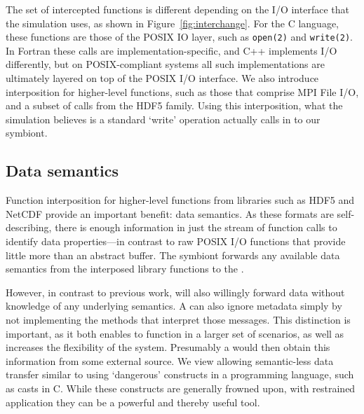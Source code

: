 The set of intercepted functions is different depending on the I/O
interface that the
simulation uses, as shown in Figure~\ref{fig:interchange}.  For the C
language, these functions are those of the POSIX
IO layer, such as \texttt{open(2)} and \texttt{write(2)}.  In Fortran
these calls are implementation-specific, and C++ implements I/O
differently, but on POSIX-compliant systems all such implementations
are ultimately layered on top of the POSIX I/O interface.  We also
introduce interposition for higher-level functions, such as those that
comprise MPI File I/O, and a subset of calls from the HDF5 family.
Using this interposition, what the simulation believes is a standard
`write' operation actually calls in to our symbiont.

\subsection{Data semantics}

Function interposition for higher-level functions from libraries such
as HDF5 and NetCDF provide an important benefit: data semantics.  As
these formats are self-describing, there is enough information in just
the stream of function calls to identify data properties---in contrast
to raw POSIX I/O functions that provide little more than an abstract
buffer.  The symbiont forwards any available data semantics from the
interposed library functions to the
\freeprocessor{}.

However, in contrast to previous work, \freeprocessing{} will also
willingly forward data without knowledge of any underlying semantics.
A \freeprocessor{} can also ignore metadata simply by not implementing
the methods that interpret those messages.  This distinction is
important, as it both enables \freeprocessing{} to function in a larger
set of scenarios, as well as increases the flexibility of the system.
Presumably a \freeprocessor{} would then obtain this information from
some external source.  We view allowing semantic-less data transfer
similar to using `dangerous' constructs in a programming language, such
as casts in C.  While these constructs are generally
frowned upon, with restrained application they can be a powerful and
thereby useful tool.


